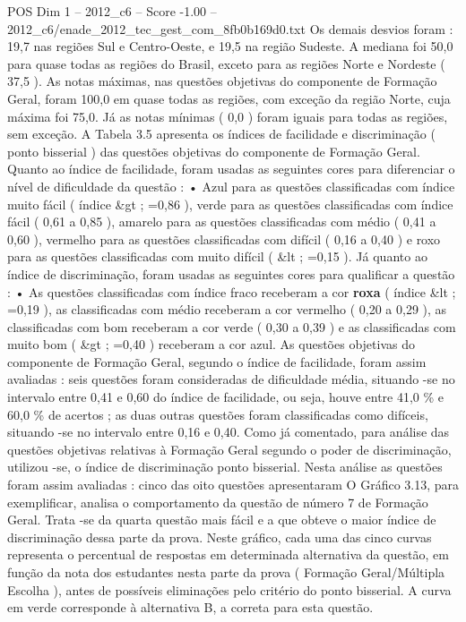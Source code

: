 \begin{textsample}{POS Dim 1 – 2012\_c6 – Score -1.00 – 2012\_c6/enade\_2012\_tec\_gest\_com\_8fb0b169d0.txt}
Os demais desvios foram : 19,7 nas regiões Sul e Centro-Oeste, e 19,5 na região Sudeste.
A mediana foi 50,0 para quase todas as regiões do Brasil, exceto para as regiões Norte e Nordeste ( 37,5 ).
As notas máximas, nas questões objetivas do componente de Formação Geral, foram 100,0 em quase todas as regiões, com exceção da região Norte, cuja máxima foi 75,0.
Já as notas mínimas ( 0,0 ) foram iguais para todas as regiões, sem exceção.
A Tabela 3.5 apresenta os índices de facilidade e discriminação ( ponto bisserial ) das questões objetivas do componente de Formação Geral.
Quanto ao índice de facilidade, foram usadas as seguintes cores para diferenciar o nível de dificuldade da questão : • Azul para as questões classificadas com índice muito fácil ( índice \&gt ; =0,86 ), verde para as questões classificadas com índice fácil ( 0,61 a 0,85 ), amarelo para as questões classificadas com médio ( 0,41 a 0,60 ), vermelho para as questões classificadas com difícil ( 0,16 a 0,40 ) e roxo para as questões classificadas com muito difícil ( \&lt ; =0,15 ).
Já quanto ao índice de discriminação, foram usadas as seguintes cores para qualificar a questão : • As questões classificadas com índice fraco receberam a cor \textbf{roxa} ( índice \&lt ; =0,19 ), as classificadas com médio receberam a cor vermelho ( 0,20 a 0,29 ), as classificadas com bom receberam a cor verde ( 0,30 a 0,39 ) e as classificadas com muito bom ( \&gt ; =0,40 ) receberam a cor azul.
As questões objetivas do componente de Formação Geral, segundo o índice de facilidade, foram assim avaliadas : seis questões foram consideradas de dificuldade média, situando -se no intervalo entre 0,41 e 0,60 do índice de facilidade, ou seja, houve entre 41,0 \% e 60,0 \% de acertos ; as duas outras questões foram classificadas como difíceis, situando -se no intervalo entre 0,16 e 0,40.
Como já comentado, para análise das questões objetivas relativas à Formação Geral segundo o poder de discriminação, utilizou -se, o índice de discriminação ponto bisserial.
Nesta análise as questões foram assim avaliadas : cinco das oito questões apresentaram O Gráfico 3.13, para exemplificar, analisa o comportamento da questão de número 7 de Formação Geral.
Trata -se da quarta questão mais fácil e a que obteve o maior índice de discriminação dessa parte da prova.
Neste gráfico, cada uma das cinco curvas representa o percentual de respostas em determinada alternativa da questão, em função da nota dos estudantes nesta parte da prova ( Formação Geral/Múltipla Escolha ), antes de possíveis eliminações pelo critério do ponto bisserial.
A curva em verde corresponde à alternativa B, a correta para esta questão.

\end{textsample}
